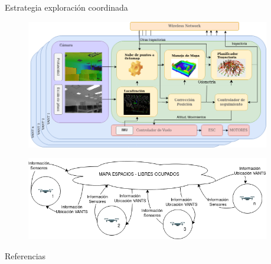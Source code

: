 \documentclass[final]{beamer}
\newlength{\sepwidth}
\newlength{\colwidth}
\newcommand{\separatorcolumn}{\begin{column}{\sepwidth}\end{column}}
\begin{document}
\begin{frame}[t]
\begin{columns}[t]
\begin{column}{\colwidth}
\begin{block}{\color{teal}Estrategia exploración coordinada}
    \begin{figure}
      \centering
      \includegraphics[width=35cm]{images/arquitectura.png}
    \end{figure}

    \begin{figure}
      \centering
      \includegraphics[width=35cm]{images/problema.png}
      \end{figure}
    

  \end{block}

  \begin{block}{\color{teal}Referencias}

    \nocite{*}
    \footnotesize{}

  \end{block}

\end{column}

\separatorcolumn
\end{columns}
\end{frame}
\end{document}
